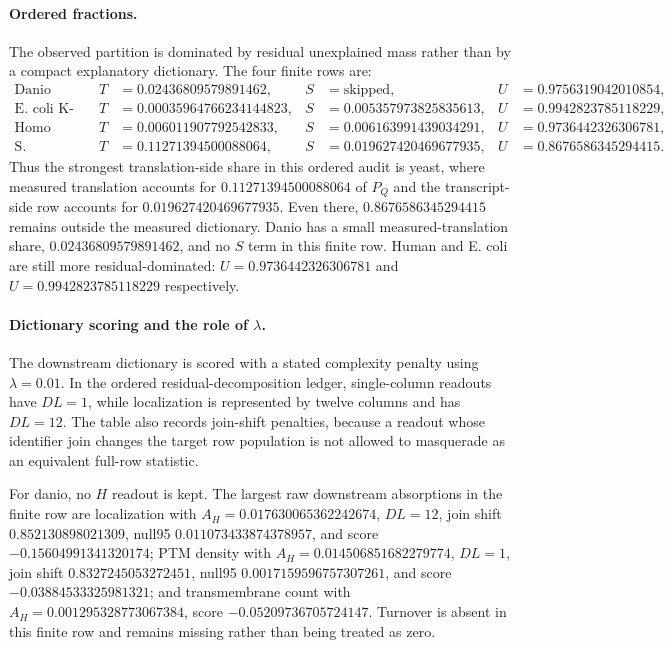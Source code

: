 \paragraph{Ordered fractions.}
The observed partition is dominated by residual unexplained mass rather than by a compact explanatory dictionary.  The four finite rows are:
$$
\begin{aligned}
\text{Danio rerio:} && T&=0.02436809579891462, & S&=\mathrm{skipped}, & U&=0.9756319042010854,\\
\text{E. coli K-12:} && T&=0.00035964766234144823, & S&=0.005357973825835613, & U&=0.9942823785118229,\\
\text{Homo sapiens:} && T&=0.006011907792542833, & S&=0.006163991439034291, & U&=0.9736442326306781,\\
\text{S. cerevisiae:} && T&=0.11271394500088064, & S&=0.019627420469677935, & U&=0.8676586345294415.
\end{aligned}
$$
Thus the strongest translation-side share in this ordered audit is yeast, where measured translation accounts for $0.11271394500088064$ of $P_Q$ and the transcript-side row accounts for $0.019627420469677935$.  Even there, $0.8676586345294415$ remains outside the measured dictionary.  Danio has a small measured-translation share, $0.02436809579891462$, and no $S$ term in this finite row.  Human and E. coli are still more residual-dominated: $U=0.9736442326306781$ and $U=0.9942823785118229$ respectively.

\paragraph{Dictionary scoring and the role of $\lambda$.}
The downstream dictionary is scored with a stated complexity penalty using $\lambda=0.01$.  In the ordered residual-decomposition ledger, single-column readouts have $DL=1$, while localization is represented by twelve columns and has $DL=12$.  The table also records join-shift penalties, because a readout whose identifier join changes the target row population is not allowed to masquerade as an equivalent full-row statistic.

For danio, no $H$ readout is kept.  The largest raw downstream absorptions in the finite row are localization with $A_H=0.017630065362242674$, $DL=12$, join shift $0.852130898021309$, null95 $0.011073433874378957$, and score $-0.15604991341320174$; PTM density with $A_H=0.014506851682279774$, $DL=1$, join shift $0.8327245053272451$, null95 $0.0017159596757307261$, and score $-0.03884533325981321$; and transmembrane count with $A_H=0.001295328773067384$, score $-0.05209736705724147$.  Turnover is absent in this finite row and remains missing rather than being treated as zero.

